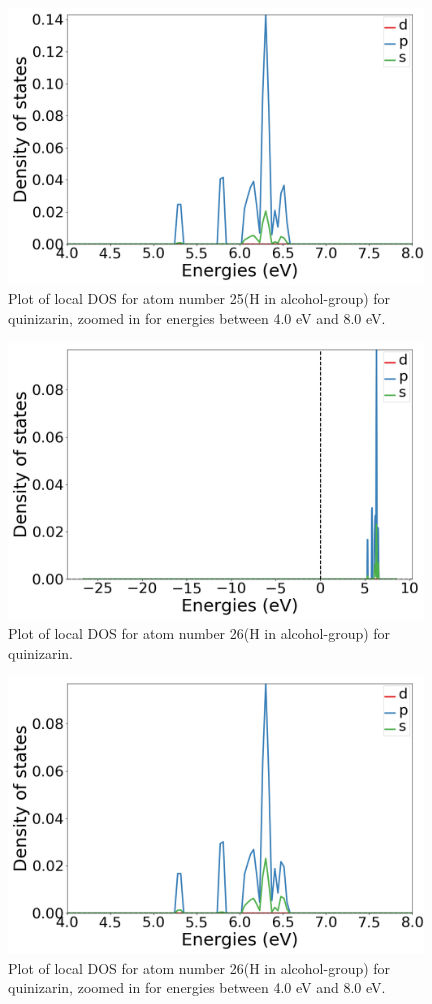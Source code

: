 \documentclass{article}
\begin{document}
  \begin{figure}[H]
      \centering
      \includegraphics[width = 11cm]{../fig/basic_k4_LDOS25_2.png}
      \caption{Plot of local DOS for atom number 25(H in alcohol-group) for quinizarin, zoomed in for energies between 4.0 eV and 8.0 eV. }
      \label{fig:basic_k4_LDOS25_2}
  \end{figure}

  \begin{figure}[H]
      \centering
      \includegraphics[width = 11cm]{../fig/basic_k4_LDOS26_1.png}
      \caption{Plot of local DOS for atom number 26(H in alcohol-group) for quinizarin. }
      \label{fig:basic_k4_LDOS26_1}
  \end{figure}

  \begin{figure}[H]
      \centering
      \includegraphics[width = 11cm]{../fig/basic_k4_LDOS26_2.png}
      \caption{Plot of local DOS for atom number 26(H in alcohol-group) for quinizarin, zoomed in for energies between 4.0 eV and 8.0 eV. }
      \label{fig:basic_k4_LDOS26_2}
  \end{figure}
\end{document}
